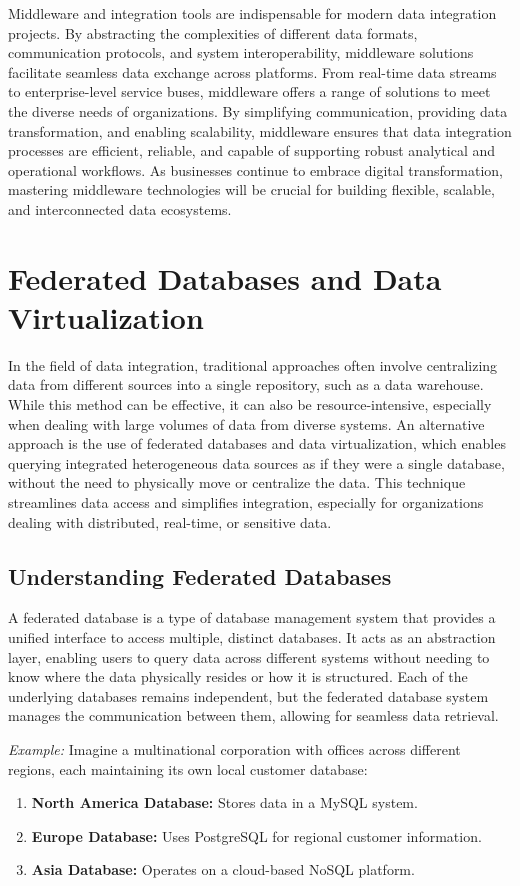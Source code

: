 \documentclass[12pt]{article}
\begin{document}
Middleware and integration tools are indispensable for modern data integration projects. By abstracting the complexities of different data formats, communication protocols, and system interoperability, middleware solutions facilitate seamless data exchange across platforms. From real-time data streams to enterprise-level service buses, middleware offers a range of solutions to meet the diverse needs of organizations. By simplifying communication, providing data transformation, and enabling scalability, middleware ensures that data integration processes are efficient, reliable, and capable of supporting robust analytical and operational workflows. As businesses continue to embrace digital transformation, mastering middleware technologies will be crucial for building flexible, scalable, and interconnected data ecosystems.

\section{Federated Databases and Data Virtualization}
In the field of data integration, traditional approaches often involve centralizing data from different sources into a single repository, such as a data warehouse. While this method can be effective, it can also be resource-intensive, especially when dealing with large volumes of data from diverse systems. An alternative approach is the use of federated databases and data virtualization, which enables querying integrated heterogeneous data sources as if they were a single database, without the need to physically move or centralize the data. This technique streamlines data access and simplifies integration, especially for organizations dealing with distributed, real-time, or sensitive data.

\subsection{Understanding Federated Databases}
A federated database is a type of database management system that provides a unified interface to access multiple, distinct databases. It acts as an abstraction layer, enabling users to query data across different systems without needing to know where the data physically resides or how it is structured. Each of the underlying databases remains independent, but the federated database system manages the communication between them, allowing for seamless data retrieval.

\textit{Example:} Imagine a multinational corporation with offices across different regions, each maintaining its own local customer database:
\begin{enumerate}
    \item \textbf{North America Database:} Stores data in a MySQL system.
    \item \textbf{Europe Database:} Uses PostgreSQL for regional customer information.
    \item \textbf{Asia Database:} Operates on a cloud-based NoSQL platform.
\end{enumerate}
\end{document}
